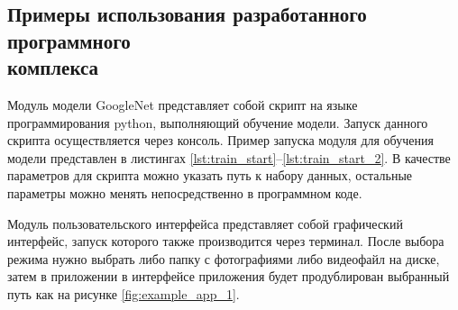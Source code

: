 \subsection{Примеры использования разработанного программного \\комплекса}
Модуль модели GoogleNet представляет собой скрипт на языке программирования python, выполняющий обучение модели. Запуск данного скрипта осуществляется через консоль. Пример запуска модуля для обучения модели представлен в листингах \ref{lst:train_start}--\ref{lst:train_start_2}. В качестве параметров для скрипта можно указать путь к набору данных, остальные параметры можно менять непосредственно в программном коде.

\clearpage


Модуль пользовательского интерфейса представляет собой графический интерфейс, запуск которого также производится через терминал. 
\newpage
После выбора режима нужно выбрать либо папку с фотографиями либо видеофайл на диске, затем в приложении в интерфейсе приложения будет продублирован выбранный путь как на рисунке \ref{fig:example_app_1}.

